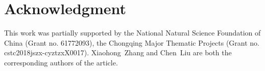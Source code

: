 \documentclass[journal]{IEEEtran}
\begin{document}



\section*{Acknowledgment}
This work was partially supported by the National Natural Science Foundation of China (Grant no. 61772093), the Chongqing Major Thematic Projects (Grant no. cstc2018jszx-cyztzxX0017). Xiaohong~Zhang and Chen~Liu are both the corresponding authors of the article.


\ifCLASSOPTIONcaptionsoff
  \newpage
\fi

\newpage






%





% 
\end{document}
